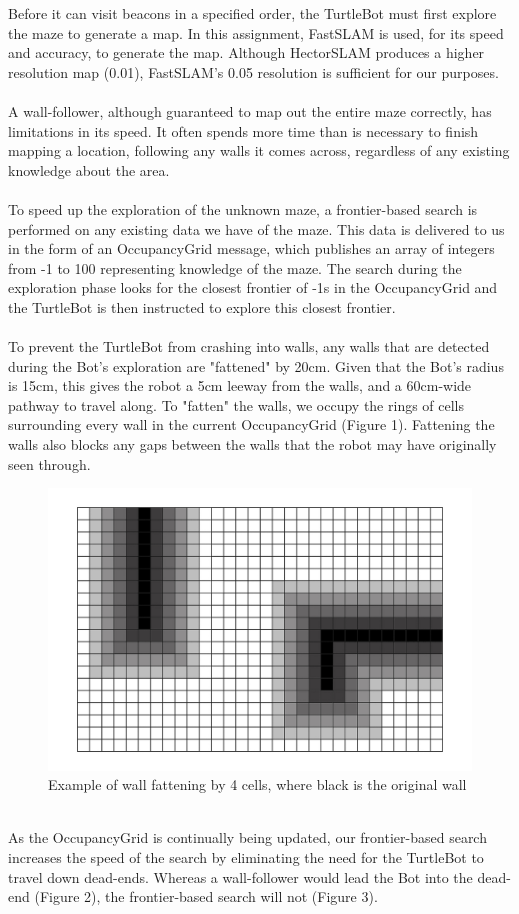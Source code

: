 \documentclass[titlepage,12pt,a4paper]{article}
\begin{document}
Before it can visit beacons in a specified order, the TurtleBot must first explore the maze to generate a map. In this assignment, FastSLAM is used, for its speed and accuracy, to generate the map. Although HectorSLAM produces a higher resolution map (0.01), FastSLAM's 0.05 resolution is sufficient for our purposes.\\
\\
A wall-follower, although guaranteed to map out the entire maze correctly, has limitations in its speed. It often spends more time than is necessary to finish mapping a location, following any walls it comes across, regardless of any existing knowledge about the area.\\
\\
To speed up the exploration of the unknown maze, a frontier-based search is performed on any existing data we have of the maze. This data is delivered to us in the form of an OccupancyGrid message, which publishes an array of integers from -1 to 100 representing knowledge of the maze. The search during the exploration phase looks for the closest frontier of -1s in the OccupancyGrid and the TurtleBot is then instructed to explore this closest frontier.\\
\\
To prevent the TurtleBot from crashing into walls, any walls that are detected during the Bot's exploration are "fattened" by 20cm. Given that the Bot's radius is 15cm, this gives the robot a 5cm leeway from the walls, and a 60cm-wide pathway to travel along. To "fatten" the walls, we occupy the rings of cells surrounding every wall in the current OccupancyGrid (Figure 1). Fattening the walls also blocks any gaps between the walls that the robot may have originally seen through.\\
\begin{figure}
	\centering
	\includegraphics[scale=0.3]{wallfatten.jpg}
	\caption{Example of wall fattening by 4 cells, where black is the original wall}
\end{figure}
\\
As the OccupancyGrid is continually being updated, our frontier-based search increases the speed of the search by eliminating the need for the TurtleBot to travel down dead-ends. Whereas a wall-follower would lead the Bot into the dead-end (Figure 2), the frontier-based search will not (Figure 3).
\end{document}
